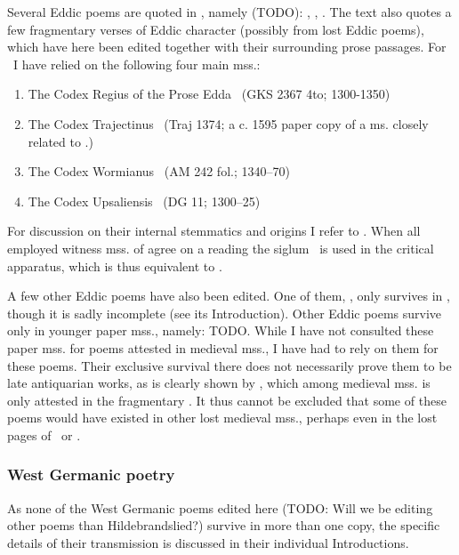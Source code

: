     Several Eddic poems are quoted in \Gylfaginning, namely (TODO): \Voluspa, \Vafthrudnismal, \Grimnismal. The text also quotes a few fragmentary verses of Eddic character (possibly from lost Eddic poems), which have here been edited together with their surrounding prose passages. For \Gylfaginning\ I have relied on the following four main mss.:\begin{enumerate}
	   \item The Codex Regius of the Prose Edda \RegiusProse\ (GKS 2367 4to; 1300-1350)
     \item The Codex Trajectinus \Trajectinus\ (Traj 1374; a c. 1595 paper copy of a ms. closely related to \RegiusProse.)
     \item The Codex Wormianus \Wormianus\ (AM 242 fol.; 1340–70)
     \item The Codex Upsaliensis \Upsaliensis\ (DG 11; 1300–25)\end{enumerate}

    For discussion on their internal stemmatics and origins I refer to \textcite{Haukur2017}. When all employed witness mss. of \Gylfaginning agree on a reading the siglum \GylfMS\ is used in the critical apparatus, which is thus equivalent to \RegiusProse\Trajectinus\Wormianus\Upsaliensis.

    A few other Eddic poems have also been edited. One of them, \Rigsthula, only survives in \Wormianus, though it is sadly incomplete (see its Introduction). Other Eddic poems survive only in younger paper mss., namely: TODO. While I have not consulted these paper mss. for poems attested in medieval mss., I have had to rely on them for these poems. Their exclusive survival there does not necessarily prove them to be late antiquarian works, as is clearly shown by \Baldrsdraumar, which among medieval mss. is only attested in the fragmentary \AM. It thus cannot be excluded that some of these poems would have existed in other lost medieval mss., perhaps even in the lost pages of \Regius\ or \AM.

    \subsubsection{West Germanic poetry}

    As none of the West Germanic poems edited here (TODO: Will we be editing other poems than Hildebrandslied?) survive in more than one copy, the specific details of their transmission is discussed in their individual Introductions.

  \printbibliography%
